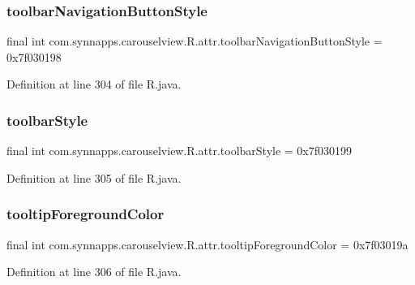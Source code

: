 \subsubsection{\texorpdfstring{toolbarNavigationButtonStyle}{toolbarNavigationButtonStyle}}
{\footnotesize\ttfamily final int com.\+synnapps.\+carouselview.\+R.\+attr.\+toolbar\+Navigation\+Button\+Style = 0x7f030198\hspace{0.3cm}{\ttfamily [static]}}



Definition at line 304 of file R.\+java.

\mbox{\label{classcom_1_1synnapps_1_1carouselview_1_1_r_1_1attr_a7d5237ff5a198a8eca70d79679ff3983}} 
\subsubsection{\texorpdfstring{toolbarStyle}{toolbarStyle}}
{\footnotesize\ttfamily final int com.\+synnapps.\+carouselview.\+R.\+attr.\+toolbar\+Style = 0x7f030199\hspace{0.3cm}{\ttfamily [static]}}



Definition at line 305 of file R.\+java.

\mbox{\label{classcom_1_1synnapps_1_1carouselview_1_1_r_1_1attr_af04d0f283537d4952e80d3ea70531a9a}} 
\subsubsection{\texorpdfstring{tooltipForegroundColor}{tooltipForegroundColor}}
{\footnotesize\ttfamily final int com.\+synnapps.\+carouselview.\+R.\+attr.\+tooltip\+Foreground\+Color = 0x7f03019a\hspace{0.3cm}{\ttfamily [static]}}



Definition at line 306 of file R.\+java.

